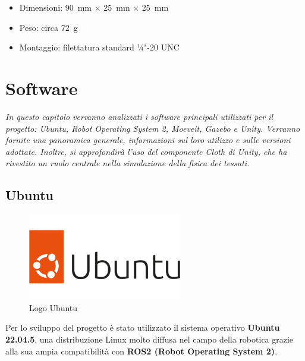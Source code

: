 \documentclass[11pt]{report}
\begin{document}
\begin{itemize}
  \item Dimensioni: 90~mm $\times$ 25~mm $\times$ 25~mm
  \item Peso: circa 72~g
  \item Montaggio: filettatura standard ¼"-20 UNC
\end{itemize}

\section{Software}
\textit{In questo capitolo verranno analizzati i software principali utilizzati per il progetto: Ubuntu, Robot Operating System 2, Moeveit, Gazebo e Unity. Verranno fornite una panoramica generale, informazioni sul loro utilizzo e sulle versioni adottate. Inoltre, si approfondirà l'uso del componente Cloth di Unity, che ha rivestito un ruolo centrale nella simulazione della fisica dei tessuti.}

\subsection{Ubuntu}

\begin{figure}[H]
    \centering
    \includegraphics[width=0.6\textwidth]{images/ubuntu1.png}
    \caption{Logo Ubuntu}
    \label{fig:Ubuntu}
\end{figure}

Per lo sviluppo del progetto è stato utilizzato il sistema operativo \textbf{Ubuntu 22.04.5}, una distribuzione Linux molto diffusa nel campo della robotica grazie alla sua ampia compatibilità con \textbf{ROS2 (Robot Operating System 2)}.
\end{document}
